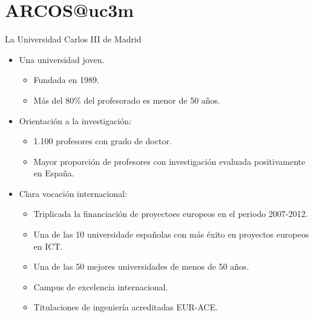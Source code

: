 \section{ARCOS@uc3m}

\begin{frame}{La Universidad Carlos III de Madrid}
\begin{itemize}
  \item Una universidad joven.
    \begin{itemize} 
      \item Fundada en 1989.
      \item Más del 80\% del profesorado es menor de 50 años.
    \end{itemize}
  \item \pause Orientación a la investigación:
    \begin{itemize}
      \item 1.100 profesores con grado de doctor.
      \item Mayor proporción de profesores con investigación evaluada positivamente en España.
    \end{itemize}
  \item \pause Clara vocación internacional:
    \begin{itemize}
      \item Triplicada la financiación de proyectoes europeos en el periodo 2007-2012.
      \item Una de las 10 universidade españolas con más éxito en proyectos europeos en ICT.
      \item Una de las 50 mejores universidades de menos de 50 años.
      \item Campus de excelencia internacional.
      \item Titulaciones de ingeniería acreditadas EUR-ACE.
    \end{itemize}
\end{itemize}
\end{frame}

